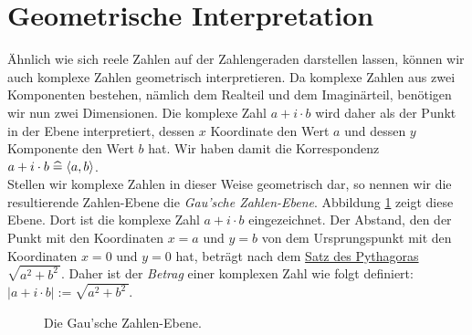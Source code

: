 \section{Geometrische Interpretation}
\"{A}hnlich wie sich reele Zahlen auf der Zahlengeraden darstellen lassen, k\"{o}nnen wir auch komplexe Zahlen
geometrisch interpretieren.  Da komplexe Zahlen aus zwei Komponenten bestehen, n\"{a}mlich dem Realteil und dem Imagin\"{a}rteil, 
ben\"{o}tigen wir nun zwei Dimensionen.  Die komplexe Zahl $a + i \cdot b$ wird daher als der Punkt in der Ebene interpretiert,
dessen $x$ Koordinate den Wert $a$ und dessen $y$ Komponente den Wert $b$ hat.  Wir haben damit die
Korrespondenz 
\\[0.2cm]
\hspace*{1.3cm}
$a + i \cdot b \;\widehat{=}\; \pair(a,b)$.
\\[0.2cm]
Stellen wir komplexe Zahlen in dieser Weise geometrisch dar, so nennen wir die resultierende Zahlen-Ebene
die \emph{\color{blue}Gau\3'sche Zahlen-Ebene}.  Abbildung \ref{fig:gauss-ebene.eps} zeigt diese Ebene.
Dort ist die komplexe Zahl $a + i \cdot b$ eingezeichnet.  Der Abstand, den der Punkt mit den Koordinaten
$x = a$ und $y = b$ von dem Ursprungspunkt mit den Koordinaten $x = 0$ und $y = 0$ hat, betr\"{a}gt nach dem
\href{https://de.wikipedia.org/wiki/Satz_des_Pythagoras}{Satz des Pythagoras} $\sqrt{a^2 + b^2\,}$.  
Daher ist der \emph{\color{blue}Betrag} einer komplexen Zahl wie folgt definiert:
\\[0.2cm]
\hspace*{1.3cm}
$|a + i \cdot b| := \sqrt{a^2 + b^2\,}$.


\begin{figure}[!ht]
  \centering
  \caption{Die Gau\3'sche Zahlen-Ebene.}
  \label{fig:gauss-ebene.eps}
\end{figure}

